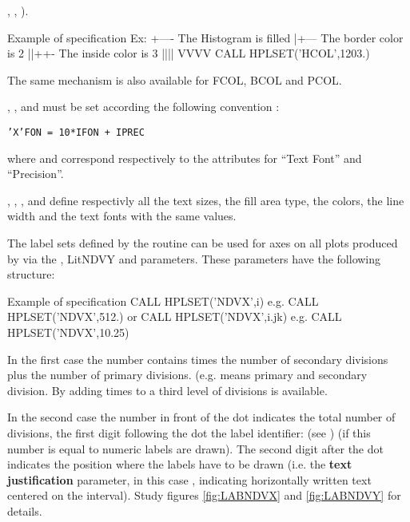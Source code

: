 \begin{UL}
      , , ).
      \begin{XMPt}{Example of  specification}
      Ex:
                             +---- The Histogram is filled
                             |+--- The border color is 2
                             ||++- The inside color is 3
                             ||||
                             VVVV
          CALL HPLSET('HCOL',1203.)
      \end{XMPt}
      The same mechanism is also available for FCOL, BCOL and PCOL.
\item {}, ,  and  must be set 
      according the following convention :
            \begin{center}
            \tt 'X'FON = 10*IFON + IPREC
            \end{center}
      where  and  correspond respectively to the \HIGZ{} 
      attributes for ``Text Font'' and ``Precision''.
\item {}, , ,  and  define 
      respectivly all the text sizes, the fill area type, the colors, the line 
      width and the text fonts with the same values.
\item The label sets defined by the routine  can be used for axes 
      on all plots produced by \HPLOT{} via the , Lit{NDVY} and 
       parameters. These parameters have the following structure:
 
      \begin{XMPt}{Example of  specification}
          CALL HPLSET('NDVX',i)      e.g.   CALL HPLSET('NDVX',512.)
       {\rm or}
          CALL HPLSET('NDVX',i.jk)   e.g.   CALL HPLSET('NDVX',10.25)
      \end{XMPt}
 
      In the first case the number  contains  times the number 
      of secondary divisions plus the number of primary divisions. (e.g. 
       means  primary and  secondary division. By adding
       times  to  a third level of divisions is 
      available. 

      In the second case the number in front of the dot  indicates the 
      total number of divisions, the first digit following the dot  the
      label identifier:  (see ) (if this number is 
      equal to  numeric labels are drawn). The second digit after the 
       dot indicates the position where the
       labels have to be drawn (i.e. the 
      {\bf text justification} parameter, in this case , indicating 
      horizontally written text centered on the interval). Study figures 
      \ref{fig:LABNDVX} and \ref{fig:LABNDVY} for details.
 

\end{UL}
